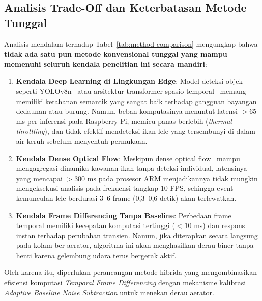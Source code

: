 \subsection{Analisis Trade-Off dan Keterbatasan Metode Tunggal}
Analisis mendalam terhadap Tabel~\ref{tab:method-comparison} mengungkap bahwa \textbf{tidak ada satu pun metode konvensional tunggal yang mampu memenuhi seluruh kendala penelitian ini secara mandiri}:
\begin{enumerate}
    \item \textbf{Kendala Deep Learning di Lingkungan Edge}: Model deteksi objek seperti YOLOv8n~\cite{Qian2025} atau arsitektur transformer spasio-temporal~\cite{Hu2026} memang memiliki ketahanan semantik yang sangat baik terhadap gangguan bayangan dedaunan atau burung. Namun, beban komputasinya menuntut latensi $>65$ ms per inferensi pada Raspberry Pi, memicu panas berlebih (\textit{thermal throttling}), dan tidak efektif mendeteksi ikan lele yang tersembunyi di dalam air keruh sebelum menyentuh permukaan.
    \item \textbf{Kendala Dense Optical Flow}: Meskipun dense optical flow~\cite{Fukae2023} mampu mengagregasi dinamika kawanan ikan tanpa deteksi individual, latensinya yang mencapai $>300$ ms pada prosesor ARM menjadikannya tidak mungkin mengeksekusi analisis pada frekuensi tangkap 10 FPS, sehingga event kemunculan lele berdurasi 3--6 frame (0,3--0,6 detik) akan terlewatkan.
    \item \textbf{Kendala Frame Differencing Tanpa Baseline}: Perbedaan frame temporal memiliki kecepatan komputasi tertinggi ($<10$ ms) dan respons instan terhadap perubahan transien. Namun, jika diterapkan secara langsung pada kolam ber-aerator, algoritma ini akan menghasilkan derau biner tanpa henti karena gelembung udara terus bergerak aktif.
\end{enumerate}

Oleh karena itu, diperlukan perancangan metode hibrida yang mengombinasikan efisiensi komputasi \textit{Temporal Frame Differencing} dengan mekanisme kalibrasi \textit{Adaptive Baseline Noise Subtraction} untuk menekan derau aerator.
